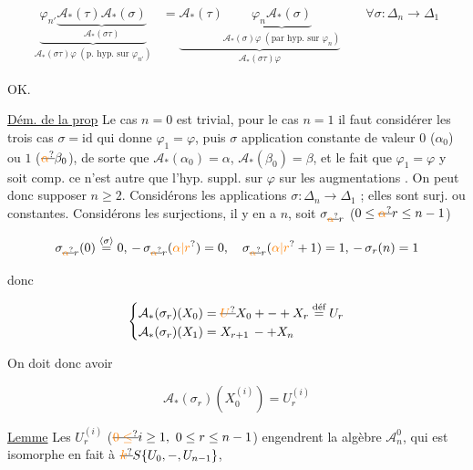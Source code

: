 

\[
\begin{aligned}
\underbrace{\varphi_{n'}\underbrace{\mathcal A_*(\tau)\mathcal A_*(\sigma)}_{\mathcal A_*(\sigma\tau)}}_{\mathcal A_*(\sigma\tau)\varphi\;(\text{p. hyp. sur }\varphi_{n'})}
&=\underbrace{\mathcal A_*(\tau)\underbrace{\varphi_n\mathcal A_*(\sigma)}_{\mathcal A_*(\sigma)\varphi\;(\text{par hyp. sur }\varphi_n)}}_{\mathcal A_*(\sigma\tau)\varphi}
\qquad\forall\sigma:\Delta_n\to\Delta_1
\end{aligned}
\]

OK.

\uline{Dém. de la prop} Le cas $n=0$ est trivial, pour le cas $n=1$ il faut considérer les trois cas $\sigma=\mathrm{id}$ qui donne $\varphi_1=\varphi$, puis $\sigma$ application constante de valeur $0$ ($\alpha_0$) ou $1$ ($\deleted{\unsure{\alpha}}\beta_0$), de sorte que $\mathcal A_*(\alpha_0)=\alpha$, $\mathcal A_*(\beta_0)=\beta$, et le fait que $\varphi_1=\varphi$ y soit comp. ce n'est autre que l'hyp. suppl. sur $\varphi$ sur les augmentations \inserted{$\alpha,\beta$}. On peut donc supposer $n\geq2$. Considérons les applications  $\sigma:\Delta_n\to\Delta_1$ ; elles sont surj. ou constantes. Considérons les surjections, il y en a $n$, soit $\sigma_{\deleted{\unsure{\alpha}}r}$ ($0\leq\deleted{\unsure{\alpha}}r\leq n-1$)

\[
\sigma_{\deleted{\unsure{\alpha}}r}(0)\overset{\inserted{\sigma}}{=}0,\,-\,\sigma_{\deleted{\unsure{\alpha}}r}(\unsure{\alpha|r})=0,\quad
\sigma_{\deleted{\unsure{\alpha}}r}(\unsure{\alpha|r}+1)=1,\,-\,\sigma_r(n)=1
\]

donc 

\[
\left\{\begin{aligned}
\mathcal A_*(\sigma_r)(X_0)&=\deleted{\unsure{U}}X_0+-+X_r\overset{\text{déf}}{=}U_r\\
\mathcal A_*(\sigma_r)(X_1)&=X_{r+1}\,-+X_n
\end{aligned}\right.
\]

On doit donc avoir

\[
\mathcal A_*(\sigma_r)(X_0^{(i)})=U_r^{(i)}
\]

\uline{Lemme} Les $U_r^{(i)}$ ($\deleted{\unsure{0\leq}}i\geq1,\ 0\leq r\leq n-1$) engendrent la algèbre $\mathcal A_n^0$, qui est isomorphe en fait à $\deleted{\unsure{k}}S\{U_0,-,U_{n-1}\}$,

